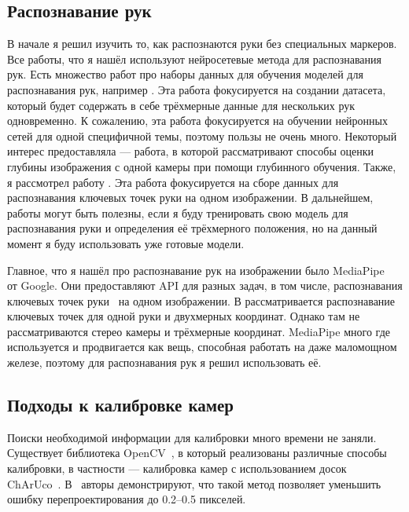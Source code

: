 \documentclass[14pt, a4paper]{extarticle}
\begin{document}
  

\subsection{Распознавание рук}
  В начале я решил изучить то, как распознаются руки без специальных маркеров.
  Все работы, что я нашёл используют нейросетевые метода для распознавания рук.
  Есть множество работ про наборы данных для обучения моделей для распознавания
  рук, например \cite{interhand}. Эта работа фокусируется на создании датасета,
  который будет содержать в себе трёхмерные данные для нескольких рук
  одновременно. К сожалению, эта работа фокусируется на обучении нейронных
  сетей для одной специфичной темы, поэтому пользы не очень много. Некоторый
  интерес предоставляла \cite{dl-depth-estimation} ---  работа, в которой
  рассматривают способы оценки глубины изображения с одной камеры при помощи
  глубинного обучения. Также, я рассмотрел работу
  \cite{multiviewbootstrapping}. Эта работа фокусируется на сборе данных для
  распознавания ключевых точек руки на одном изображении. В дальнейшем, работы
  \cite{interhand, multiviewbootstrapping} могут быть полезны, если я буду
  тренировать свою модель для распознавания руки и определения её трёхмерного
  положения, но на данный момент я буду использовать уже готовые модели.


  Главное, что я нашёл про распознавание рук на изображении было
  Media\-Pipe~\cite{mediapipe_paper} от Google. Они предоставляют API для разных
  задач, в том числе, распознавания ключевых точек руки~\cite{mediapipe_hands}
  на одном изображении. В \cite{mediapipe_hands} рассматривается распознавание
  ключевых точек для одной руки и двухмерных координат. Однако там не
  рассматриваются стерео камеры и трёхмерные координат. MediaPipe много где
  используется и продвигается как вещь, способная работать на даже маломощном
  железе, поэтому для распознавания рук я решил использовать её.
    
\subsection{Подходы к калибровке камер}
Поиски необходимой информации для калибровки много времени не заняли.
Существует библиотека OpenCV~\cite{opencv}, в который реализованы различные
способы калибровки, в частности --- калибровка камер с использованием досок
ChArUco~\cite{opencv_charuco}. В~\cite{opencv_charuco} авторы демонстрируют,
что такой метод позволяет уменьшить ошибку перепроектирования до 0.2--0.5 пикселей.
\end{document}
